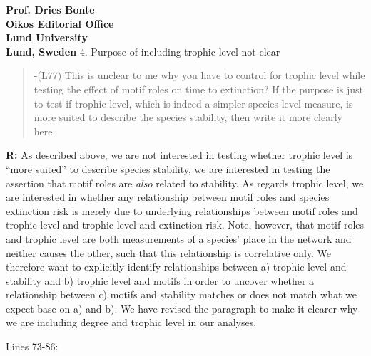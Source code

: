 \documentclass[12pt]{letter}
\begin{document}
\begin{letter}{\bf Prof. Dries Bonte\\
Oikos Editorial Office \\
Lund University \\
Lund, Sweden}
    4. Purpose of including trophic level not clear

        \begin{quotation}
        -(L77) This is unclear to me why you have to control for trophic level while testing the effect of motif roles on time to extinction? If the purpose is just to test if trophic level, which is indeed a simpler species level measure, is more suited to describe the species stability, then write it more clearly here.
        \end{quotation}
        
        \textbf{R:} As described above, we are not interested in testing whether trophic level is ``more suited'' to describe species stability, we are interested in testing the assertion that motif roles are \emph{also} related to stability.
        As regards trophic level, we are interested in whether any relationship between motif roles and species extinction risk is merely due to underlying relationships between motif roles and trophic level and trophic level and extinction risk.
        Note, however, that motif roles and trophic level are both measurements of a species' place in the network and neither causes the other, such that this relationship is correlative only.
        We therefore want to explicitly identify relationships between a) trophic level and stability and b) trophic level and motifs in order to uncover whether a relationship between c) motifs and stability matches or does not match what we expect base on a) and b).
        We have revised the paragraph to make it clearer why we are including degree and trophic level in our analyses.

        
        Lines 73-86:
      

\end{letter}
\end{document}
